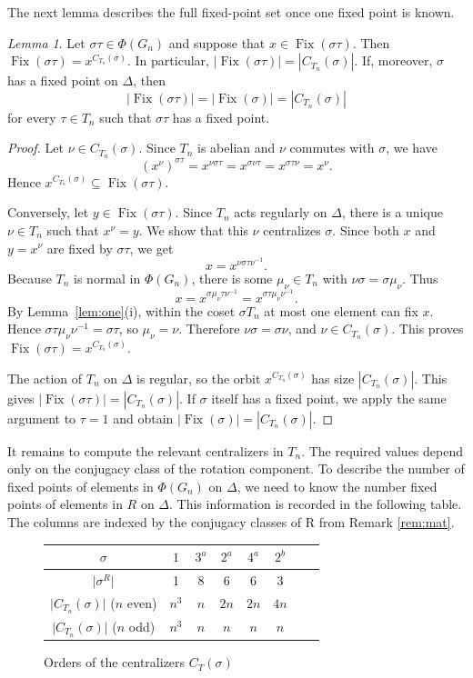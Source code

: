 \documentclass[12pt]{article}
\theoremstyle{definition}
\theoremstyle{remark}
\newtheorem{lemma}[theorem]{Lemma}
\DeclareMathOperator{\Fix}{Fix}
\begin{document}
The next lemma describes the full fixed-point set once one fixed point is known.
\begin{lemma}\label{lem:two}
Let $\sigma\tau\in\Phi(G_n)$ and suppose that $x\in\Fix(\sigma\tau)$. Then
$\Fix(\sigma\tau)=x^{C_{T_n}(\sigma)}.
$ In particular,
$|\Fix(\sigma\tau)|=|C_{T_n}(\sigma)|.$
If, moreover, $\sigma$ has a fixed point on $\Delta$, then
\[
|\Fix(\sigma\tau)|=|\Fix(\sigma)|=|C_{T_n}(\sigma)|
\]
for every $\tau\in T_n$ such that $\sigma\tau$ has a fixed point.
\end{lemma}
\begin{proof}
Let $\nu\in C_{T_n}(\sigma)$. Since $T_n$ is abelian and $\nu$ commutes with $\sigma$, we have
\[
(x^\nu)^{\sigma\tau}
=x^{\nu\sigma\tau}
=x^{\sigma\nu\tau}
=x^{\sigma\tau\nu}
=x^\nu.
\]
Hence $x^{C_{T_n}(\sigma)}\subseteq\Fix(\sigma\tau)$.

Conversely, let $y\in\Fix(\sigma\tau)$. Since $T_n$ acts regularly on $\Delta$, there is a unique $\nu\in T_n$ such that $x^\nu=y$. We show that this $\nu$ centralizes $\sigma$. Since both $x$ and $y=x^\nu$ are fixed by $\sigma\tau$, we get
\[
x=x^{\nu\sigma\tau\nu^{-1}}.
\]
Because $T_n$ is normal in $\Phi(G_n)$, there is some $\mu_\nu\in T_n$ with $\nu\sigma=\sigma\mu_\nu$. Thus
\[
x=x^{\sigma\mu_\nu\tau\nu^{-1}}
 =x^{\sigma\tau\mu_\nu\nu^{-1}}.
\]
By Lemma~\ref{lem:one}(i), within the coset $\sigma T_n$ at most one element can fix $x$. Hence $\sigma\tau\mu_\nu\nu^{-1}=\sigma\tau$, so $\mu_\nu=\nu$. Therefore $\nu\sigma=\sigma\nu$, and $\nu\in C_{T_n}(\sigma)$. This proves $\Fix(\sigma\tau)=x^{C_{T_n}(\sigma)}$.

The action of $T_n$ on $\Delta$ is regular, so the orbit $x^{C_{T_n}(\sigma)}$ has size $|C_{T_n}(\sigma)|$. This gives $|\Fix(\sigma\tau)|=|C_{T_n}(\sigma)|$. If $\sigma$ itself has a fixed point, we apply the same argument to $\tau=1$ and obtain $|\Fix(\sigma)|=|C_{T_n}(\sigma)|$.

 \end{proof}

It remains to compute the relevant centralizers in $T_n$. The required values depend only on the conjugacy class of the rotation component.
To describe the number of fixed points of elements in $\Phi(G_n)$ on $\Delta$,
we need to know the number fixed points of elements in
$R$ on $\Delta.$ This information is recorded in the following table.
The columns are indexed by the conjugacy classes of R from Remark \ref{rem:mat}.

\begin{figure}[h]
\centering
\begin{tabular}{cccccccc}
\toprule
 $\sigma$ & $1$ & $3^a$ & $2^a$ & $4^a$& $2^b$\\
   \midrule
   $\vert \sigma^R\vert $ & 1 &8 & 6 & 6 & 3 \\
   \midrule
   $\vert C_{T_n}(\sigma)\vert $ ($n$ even)  & $n^3$ & $n$ & $2n$ & $2n$ & $4n$\\
   \midrule
   $\vert C_{T_n}(\sigma)\vert $ ($n$ odd) & $n^3$ & $n$ & $n$ & $n$ & $n$\\
\bottomrule
\end{tabular}
\caption{Orders of the centralizers $C_T(\sigma)$}\label{fig:deltafixp}
\end{figure}
\end{document}
